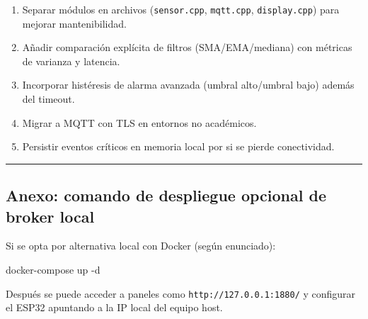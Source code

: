 \documentclass[11pt]{article}
\providecommand{\tightlist}{%
      \setlength{\itemsep}{0pt}\setlength{\parskip}{0pt}}
\newenvironment{Shaded}{}{}
\newcommand{\NormalTok}[1]{{#1}}
\newcommand{\OperatorTok}[1]{\textcolor[rgb]{0.40,0.40,0.40}{{#1}}}
\begin{document}
\begin{enumerate}
\def\labelenumi{\arabic{enumi}.}
\tightlist
\item
  Separar módulos en archivos (\texttt{sensor.cpp}, \texttt{mqtt.cpp},
  \texttt{display.cpp}) para mejorar mantenibilidad.
\item
  Añadir comparación explícita de filtros (SMA/EMA/mediana) con métricas
  de varianza y latencia.
\item
  Incorporar histéresis de alarma avanzada (umbral alto/umbral bajo)
  además del timeout.
\item
  Migrar a MQTT con TLS en entornos no académicos.
\item
  Persistir eventos críticos en memoria local por si se pierde
  conectividad.
\end{enumerate}

\begin{center}\rule{0.5\linewidth}{0.5pt}\end{center}

\subsection{Anexo: comando de despliegue opcional de broker
local}\label{anexo-comando-de-despliegue-opcional-de-broker-local}

Si se opta por alternativa local con Docker (según enunciado):

\begin{Shaded}
\begin{Highlighting}[]
\NormalTok{docker}\OperatorTok{{-}}\NormalTok{compose up }\OperatorTok{{-}}\NormalTok{d}
\end{Highlighting}
\end{Shaded}

Después se puede acceder a paneles como \texttt{http://127.0.0.1:1880/}
y configurar el ESP32 apuntando a la IP local del equipo host.


    
    
    
\end{document}
